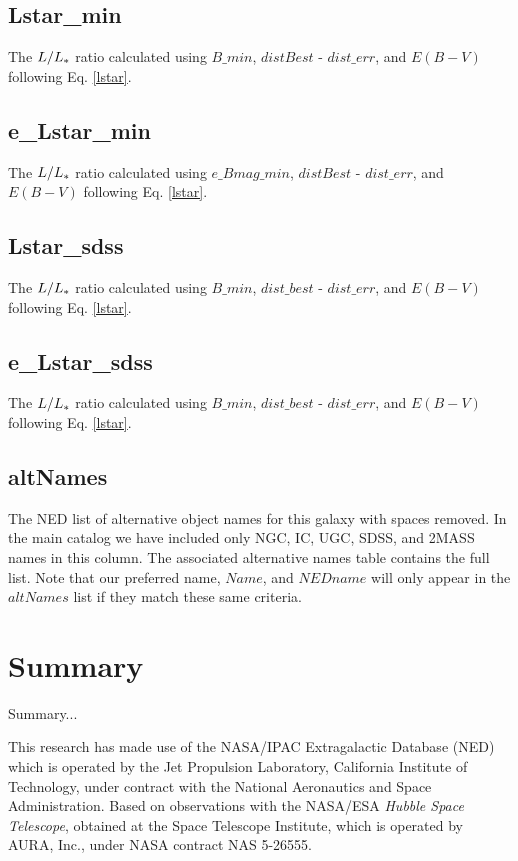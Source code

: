 \documentclass[iop]{emulateapj-rtx4}
\begin{document}
\subsection{Lstar\_min}
The $L / L_{\**}$ ratio calculated using $B\_min$, $distBest$ - $dist\_err$, and $E(B-V)$ following Eq. \ref{lstar}.

\subsection{e\_Lstar\_min}
The $L / L_{\**}$ ratio calculated using $e\_Bmag\_min$, $distBest$ - $dist\_err$, and $E(B-V)$ following Eq. \ref{lstar}.

\subsection{Lstar\_sdss}
The $L / L_{\**}$ ratio calculated using $B\_min$, $dist\_best$ - $dist\_err$, and $E(B-V)$ following Eq. \ref{lstar}.

\subsection{e\_Lstar\_sdss}
The $L / L_{\**}$ ratio calculated using $B\_min$, $dist\_best$ - $dist\_err$, and $E(B-V)$ following Eq. \ref{lstar}.

\subsection{altNames}
The NED list of alternative object names for this galaxy with spaces removed. In the main catalog we have included only NGC, IC, UGC, SDSS, and 2MASS names in this column. The associated alternative names table contains the full list. Note that our preferred name, $Name$, and $NEDname$ will only appear in the $altNames$ list if they match these same criteria.


\section{Summary}

Summary...

This research has made use of the NASA/IPAC Extragalactic Database (NED) which is operated by the Jet Propulsion Laboratory, California Institute of Technology, under contract with the National Aeronautics and Space Administration. Based on observations with the NASA/ESA \textit{Hubble Space Telescope}, obtained at the Space Telescope Institute, which is operated by AURA, Inc., under NASA contract NAS 5-26555.


\nocite{*}


\end{document}
